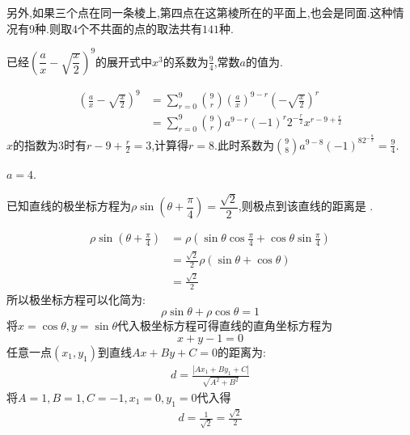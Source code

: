 \documentclass[answers]{exam}
\begin{document}
\begin{questions}
\begin{solution}
\begin{enumerate}[label=\protect\circled{\arabic*}]
\begin{enumerate}[label=\Roman*]
\begin{center}
				            \end{center}
			      \end{enumerate}
		\end{enumerate}
		另外,如果三个点在同一条棱上,第四点在这第棱所在的平面上,也会是同面.这种情况有9种.则取$4$个不共面的点的取法共有$141$种.
	\end{solution}

	\question 已经$\left( \dfrac{a}{x} -\sqrt{\dfrac{x}{2}}
		\right)^9$的展开式中$x^3$的系数为$\frac94$,常数$a$的值为\fillin[36][2cm].

	\begin{solution}
		\begin{align*}
			\left( \frac{a}{x} - \sqrt{\frac{x}{2}} \right)^9
			 & = \sum_{r=0}^9\binom{9}{r} \left( \frac{a}{x} \right)^{9-r} \left( -\sqrt{\frac{x}{2}} \right)^r \\
			 & = \sum_{r=0}^{9}\binom{9}{r} a^{9-r}(-1)^r2^{-\frac{r}{2}}x^{r-9 + \frac{r}{2}}
		\end{align*}
		$x$的指数为$3$时有$r-9+\frac{r}{2} = 3$,计算得$r=8$.此时系数为$\binom{9}{8}a^{9-8}(-1)^82^{-\frac{8}{2}} = \frac94$.

		$a=4$.
	\end{solution}
	\question 已知直线的极坐标方程为$\rho\sin \left( \theta + \dfrac{\pi}{4} \right) =
		\dfrac{\sqrt{2}}{2}$,则极点到该直线的距离是 .

	\begin{solution}
		\begin{align*}
			\rho\sin \left( \theta + \frac{\pi}{4} \right)
			 & = \rho( \sin\theta\cos\frac{\pi}{4} + \cos\theta\sin\frac{\pi}{4}) \\
			 & =  \frac{\sqrt{2}}{2}\rho(\sin\theta + \cos\theta)                 \\
			 & = \frac{\sqrt{2}}{2}
		\end{align*}
		所以极坐标方程可以化简为:
		\begin{equation*}
			\rho\sin\theta + \rho\cos\theta = 1
		\end{equation*}
		将$x=\cos\theta, y=\sin\theta$代入极坐标方程可得直线的直角坐标方程为
		\begin{equation*}
			x + y - 1 = 0
		\end{equation*}
		任意一点$(x_1, y_1)$到直线$Ax+By+C=0$的距离为:
		\begin{align*}
			d = \frac{|Ax_1+By_1+C|}{\sqrt{A^2+B^2}}
		\end{align*}
		将$A=1,B=1,C=-1,x_1=0, y_1=0$代入得
		\begin{align*}
			d = \frac{1}{\sqrt{2}} = \frac{\sqrt{2}}{2}
		\end{align*}
	\end{solution}


\end{questions}
\end{document}
